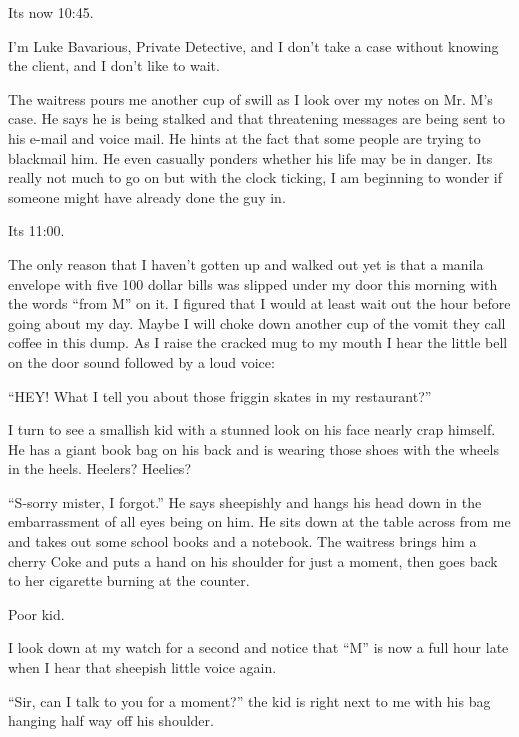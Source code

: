 Its now 10:45.



I'm Luke Bavarious, Private Detective, and I don't take a case
without knowing the client, and I don't like to wait.



The waitress pours me another cup of swill as I look over my notes
on Mr. M's case. He says he is being stalked and that threatening
messages are being sent to his e-mail and voice mail. He hints at
the fact that some people are trying to blackmail him. He even
casually ponders whether his life may be in danger. Its really not
much to go on but with the clock ticking, I am beginning to wonder
if someone might have already done the guy in.



Its 11:00.



The only reason that I haven't gotten up and walked out yet is that
a manila envelope with five 100 dollar bills was slipped under my
door this morning with the words ``from M'' on it. I figured that I
would at least wait out the hour before going about my day. Maybe I
will choke down another cup of the vomit they call coffee in this
dump. As I raise the cracked mug to my mouth I hear the little bell
on the door sound followed by a loud voice:



``HEY! What I tell you about those friggin skates in my
restaurant?''

I turn to see a smallish kid with a stunned look on his face nearly
crap himself. He has a giant book bag on his back and is wearing
those shoes with the wheels in the heels. Heelers? Heelies?



``S-sorry mister, I forgot.'' He says sheepishly and hangs his head
down in the embarrassment of all eyes being on him. He sits down at
the table across from me and takes out some school books and a
notebook. The waitress brings him a cherry Coke and puts a hand on
his shoulder for just a moment, then goes back to her cigarette
burning at the counter.



Poor kid.



I look down at my watch for a second and notice that ``M'' is now a
full hour late when I hear that sheepish little voice again.



``Sir, can I talk to you for a moment?'' the kid is right next to me
with his bag hanging half way off his shoulder.



